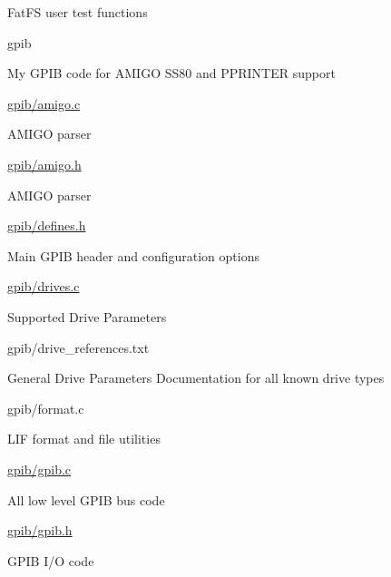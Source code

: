 \begin{DoxyItemize}
\begin{DoxyItemize}
\begin{DoxyItemize}
\item Fat\+FS user test functions
\end{DoxyItemize}
\end{DoxyItemize}
\item gpib
\begin{DoxyItemize}
\item My G\+P\+IB code for A\+M\+I\+GO S\+S80 and P\+P\+R\+I\+N\+T\+ER support
\item \hyperlink{amigo_8c}{gpib/amigo.\+c}
\begin{DoxyItemize}
\item A\+M\+I\+GO parser
\end{DoxyItemize}
\item \hyperlink{amigo_8h}{gpib/amigo.\+h}
\begin{DoxyItemize}
\item A\+M\+I\+GO parser
\end{DoxyItemize}
\item \hyperlink{defines_8h}{gpib/defines.\+h}
\begin{DoxyItemize}
\item Main G\+P\+IB header and configuration options
\end{DoxyItemize}
\item \hyperlink{drives_8c}{gpib/drives.\+c}
\begin{DoxyItemize}
\item Supported Drive Parameters
\end{DoxyItemize}
\item gpib/drive\+\_\+references.\+txt
\begin{DoxyItemize}
\item General Drive Parameters Documentation for all known drive types
\end{DoxyItemize}
\item gpib/format.\+c
\begin{DoxyItemize}
\item L\+IF format and file utilities
\end{DoxyItemize}
\item \hyperlink{gpib_8c}{gpib/gpib.\+c}
\begin{DoxyItemize}
\item All low level G\+P\+IB bus code
\end{DoxyItemize}
\item \hyperlink{gpib_8h}{gpib/gpib.\+h}
\begin{DoxyItemize}
\item G\+P\+IB I/O code

\end{DoxyItemize}
\end{DoxyItemize}
\end{DoxyItemize}
